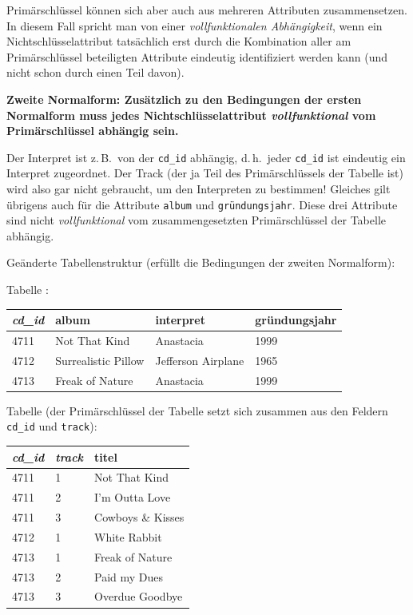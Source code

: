 Primärschlüssel können sich aber auch aus mehreren Attributen zusammensetzen. 
In diesem Fall spricht man von einer \emph{vollfunktionalen Abhängigkeit}, wenn 
ein Nichtschlüsselattribut tatsächlich erst durch die Kombination aller am 
Primärschlüssel beteiligten Attribute eindeutig identifiziert werden kann 
(und nicht schon durch einen Teil davon).

\textbf{Zweite Normalform: Zusätzlich zu den Bedingungen der ersten Normalform
muss jedes Nichtschlüsselattribut \emph{vollfunktional}
vom Primärschlüssel abhängig sein.}

Der Interpret ist z.\,B.\ von der \lstinline|cd_id| abhängig, d.\,h.\ jeder
\lstinline|cd_id| ist eindeutig ein Interpret zugeordnet. Der Track (der ja
Teil des Primärschlüssels der Tabelle ist) wird also gar nicht gebraucht, um den
Interpreten zu bestimmen! Gleiches gilt übrigens auch für die Attribute
\lstinline|album| und \lstinline|gründungsjahr|. Diese drei Attribute sind nicht
\emph{vollfunktional} vom zusammengesetzten Primärschlüssel der Tabelle
abhängig.

Geänderte Tabellenstruktur (erfüllt die Bedingungen der zweiten Normalform):

Tabelle :

\vspace{1mm}

\begin{tabular}{|l|l|l|l|}\hline
\textbf{\em cd\_id} & \textbf{album} & \textbf{interpret} &
\textbf{gründungsjahr}\\ \hline 
4711 & Not That Kind & Anastacia & 1999\\ \hline
4712 & Surrealistic Pillow & Jefferson Airplane & 1965\\ \hline
4713 & Freak of Nature & Anastacia & 1999\\ \hline
\end{tabular}

\vspace{2mm}

Tabelle  (der Primärschlüssel der Tabelle setzt
sich zusammen aus den Feldern \lstinline|cd_id| und \lstinline|track|):

\vspace{1mm}

\begin{tabular}{|l|l|l|}\hline
\textbf{\em cd\_id} & \textbf{\em track} & \textbf{titel}\\ \hline
4711 & 1 & Not That Kind\\ \hline
4711 & 2 & I'm Outta Love\\ \hline
4711 & 3 & Cowboys \& Kisses\\ \hline
4712 & 1 & White Rabbit\\ \hline
4713 & 1 & Freak of Nature\\ \hline
4713 & 2 & Paid my Dues\\ \hline
4713 & 3 & Overdue Goodbye\\ \hline
\end{tabular}

